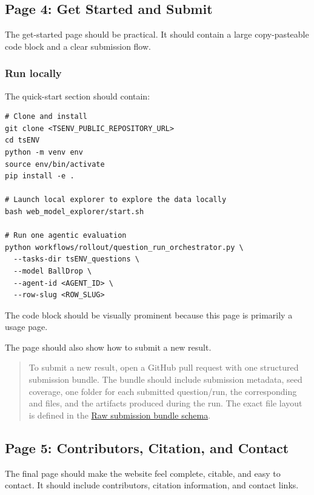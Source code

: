 \documentclass[11pt]{article}
\begin{document}
\label{sec:website-page-get-started}
\subsection*{Page 4: Get Started and Submit}

The get-started page should be practical.
It should contain a large copy-pasteable code block and a clear submission flow.

\subsubsection*{Run locally}

The quick-start section should contain:

\begin{verbatim}
# Clone and install
git clone <TSENV_PUBLIC_REPOSITORY_URL>
cd tsENV
python -m venv env
source env/bin/activate
pip install -e .

# Launch local explorer to explore the data locally
bash web_model_explorer/start.sh

# Run one agentic evaluation
python workflows/rollout/question_run_orchestrator.py \
  --tasks-dir tsENV_questions \
  --model BallDrop \
  --agent-id <AGENT_ID> \
  --row-slug <ROW_SLUG>
\end{verbatim}

The code block should be visually prominent because this page is primarily a usage page.

The page should also show how to submit a new result.

\begin{quote}
To submit a new result, open a GitHub pull request with one structured submission bundle.
The bundle should include submission metadata, seed coverage, one folder for each submitted question/run, the corresponding  and  files, and the artifacts produced during the run.
The exact file layout is defined in the \hyperref[sec:website-raw-submission-bundle]{Raw submission bundle schema}.
\end{quote}


\phantomsection\label{sec:website-page-contributors}
\subsection*{Page 5: Contributors, Citation, and Contact}

The final page should make the website feel complete, citable, and easy to contact.
It should include contributors, citation information, and contact links.
\end{document}
